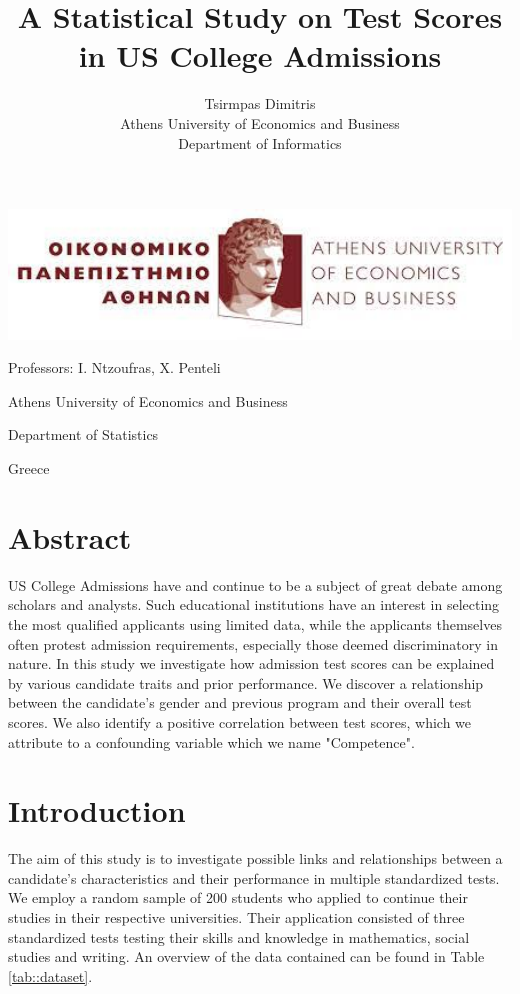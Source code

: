 \documentclass[10pt, a4paper]{article}
\title{\Huge A Statistical Study on Test Scores in US College Admissions }
\author{\LARGE Tsirmpas Dimitris\\Athens University of Economics and Business\\Department of Informatics}
\begin{document}
	
	\begin{titlepage}
		\maketitle
		\begin{center}
					
			\includegraphics[width=1\textwidth]{aueb_logo.jpg}
			
			 \LARGE Professors: I. Ntzoufras, X. Penteli
			
			 \large Athens University of Economics and Business
			
			\large Department of Statistics
			
			\large Greece
		\end{center}
	
	\end{titlepage}
	
	\tableofcontents
	\newpage
	
	\section{Abstract}
	US College Admissions have and continue to be a subject of great debate among scholars and analysts. Such educational institutions have an interest in selecting the most qualified applicants using limited data, while the applicants themselves often protest admission requirements, especially those deemed discriminatory in nature. In this study we investigate how admission test scores can be explained by various candidate traits and prior performance. We discover a relationship between the candidate's gender and previous program and their overall test scores. We also identify a positive correlation between test scores, which we attribute to a confounding variable which we name "Competence".
	
	
	\section{Introduction}
	
	The aim of this study is to investigate possible links and relationships between a candidate's characteristics and their performance in multiple standardized tests. We employ a random sample of 200 students who applied to continue their studies in their respective universities. Their application consisted of three standardized tests testing their skills and knowledge in mathematics, social studies and writing. An overview of the data contained can be found in Table \ref{tab::dataset}. 
	
\end{document}
